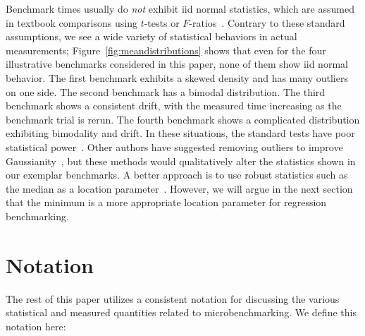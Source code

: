 \documentclass[conference]{IEEEtran}
\begin{document}
Benchmark times usually do \textit{not} exhibit iid normal statistics,
which are assumed in textbook comparisons using $t$-tests or
$F$-ratios~\cite{Lilja2000}.
Contrary to these standard assumptions,
we see a wide variety of statistical behaviors in actual measurements;
Figure~\ref{fig:meandistributions} shows that even for the four illustrative
benchmarks considered in this paper, none of them show iid normal behavior.
The first benchmark exhibits a skewed density and has many outliers on one side.
The second benchmark has a bimodal distribution.
The third benchmark shows a consistent drift, with the measured time increasing
as the benchmark trial is rerun.
The fourth benchmark shows a complicated distribution exhibiting bimodality and
drift.
In these situations, the standard tests have poor statistical
power~\cite{Mytkowicz2009,Kalibera2013,Chen2015,Barrett2016}.
Other authors have suggested removing outliers to improve
Gaussianity~\cite{Rehn2015}, but these methods would
qualitatively alter the statistics shown in our exemplar benchmarks.
A better approach is to use robust statistics such as the median as a location
parameter~\cite{Hampel1971,Mytkowicz2009,Touati2013}.
However, we will argue in the next section that the minimum is a more appropriate
location parameter for regression benchmarking.


\label{sec:notation}
\section{Notation}

The rest of this paper utilizes a consistent notation for discussing the various statistical
and measured quantities related to microbenchmarking. We define this notation here:
\end{document}
